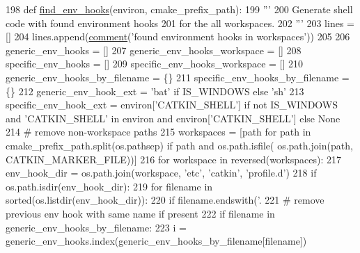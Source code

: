 \begin{DoxyCode}
198 \textcolor{keyword}{def }\hyperlink{namespace__setup__util_a73de35ca77f260af6691470342ab49ce}{find\_env\_hooks}(environ, cmake\_prefix\_path):
199     \textcolor{stringliteral}{'''}
200 \textcolor{stringliteral}{    Generate shell code with found environment hooks}
201 \textcolor{stringliteral}{    for the all workspaces.}
202 \textcolor{stringliteral}{    '''}
203     lines = []
204     lines.append(\hyperlink{namespace__setup__util_abe8c95c4cfe8b1374dacd5f91d984353}{comment}(\textcolor{stringliteral}{'found environment hooks in workspaces'}))
205 
206     generic\_env\_hooks = []
207     generic\_env\_hooks\_workspace = []
208     specific\_env\_hooks = []
209     specific\_env\_hooks\_workspace = []
210     generic\_env\_hooks\_by\_filename = \{\}
211     specific\_env\_hooks\_by\_filename = \{\}
212     generic\_env\_hook\_ext = \textcolor{stringliteral}{'bat'} \textcolor{keywordflow}{if} IS\_WINDOWS \textcolor{keywordflow}{else} \textcolor{stringliteral}{'sh'}
213     specific\_env\_hook\_ext = environ[\textcolor{stringliteral}{'CATKIN\_SHELL'}] \textcolor{keywordflow}{if} \textcolor{keywordflow}{not} IS\_WINDOWS \textcolor{keywordflow}{and} \textcolor{stringliteral}{'CATKIN\_SHELL'} \textcolor{keywordflow}{in} environ \textcolor{keywordflow}{and} 
      environ[\textcolor{stringliteral}{'CATKIN\_SHELL'}] \textcolor{keywordflow}{else} \textcolor{keywordtype}{None}
214     \textcolor{comment}{# remove non-workspace paths}
215     workspaces = [path \textcolor{keywordflow}{for} path \textcolor{keywordflow}{in} cmake\_prefix\_path.split(os.pathsep) \textcolor{keywordflow}{if} path \textcolor{keywordflow}{and} os.path.isfile(
      os.path.join(path, CATKIN\_MARKER\_FILE))]
216     \textcolor{keywordflow}{for} workspace \textcolor{keywordflow}{in} reversed(workspaces):
217         env\_hook\_dir = os.path.join(workspace, \textcolor{stringliteral}{'etc'}, \textcolor{stringliteral}{'catkin'}, \textcolor{stringliteral}{'profile.d'})
218         \textcolor{keywordflow}{if} os.path.isdir(env\_hook\_dir):
219             \textcolor{keywordflow}{for} filename \textcolor{keywordflow}{in} sorted(os.listdir(env\_hook\_dir)):
220                 \textcolor{keywordflow}{if} filename.endswith(\textcolor{stringliteral}{'.%
221                     \textcolor{comment}{# remove previous env hook with same name if present}
222                     \textcolor{keywordflow}{if} filename \textcolor{keywordflow}{in} generic\_env\_hooks\_by\_filename:
223                         i = generic\_env\_hooks.index(generic\_env\_hooks\_by\_filename[filename])
}
\end{DoxyCode}
